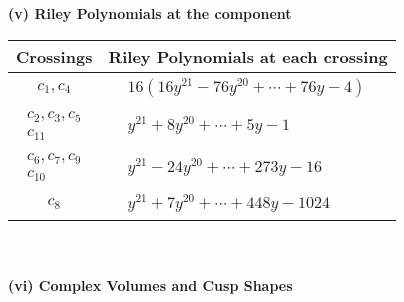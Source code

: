 \documentclass[1p]{elsarticle_modified}
\theoremstyle{definition}
\begin{document}
\newpage\renewcommand{\arraystretch}{1}
\flushleft \textbf{(v) Riley Polynomials at the component}\newline \\
\begin{tabular}{m{50pt}|m{274pt}}
Crossings & \hspace{64pt}Riley Polynomials at each crossing \\
\hline $$\begin{aligned}c_{1},c_{4}\end{aligned}$$&$\begin{aligned}
&16(16 y^{21}-76 y^{20}+\cdots+76 y-4)
\end{aligned}$\\
\hline $$\begin{aligned}c_{2},c_{3},c_{5}\\c_{11}\end{aligned}$$&$\begin{aligned}
&y^{21}+8 y^{20}+\cdots+5 y-1
\end{aligned}$\\
\hline $$\begin{aligned}c_{6},c_{7},c_{9}\\c_{10}\end{aligned}$$&$\begin{aligned}
&y^{21}-24 y^{20}+\cdots+273 y-16
\end{aligned}$\\
\hline $$\begin{aligned}c_{8}\end{aligned}$$&$\begin{aligned}
&y^{21}+7 y^{20}+\cdots+448 y-1024
\end{aligned}$\\
\hline
\end{tabular}\\~\\
\newpage\flushleft \textbf{(vi) Complex Volumes and Cusp Shapes}
\end{document}
